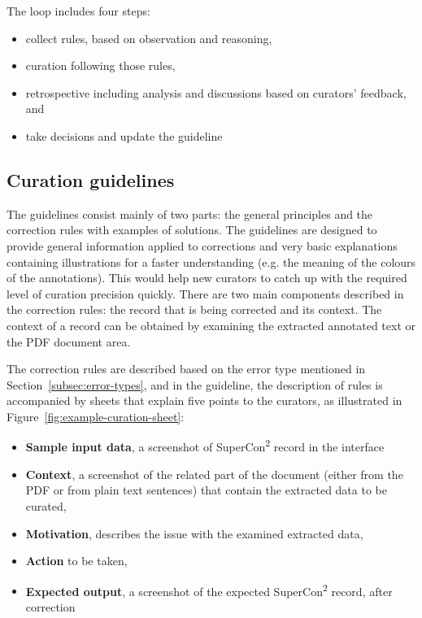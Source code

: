 \documentclass[a4paper]{article}
\begin{document}
The loop includes four steps: 
\begin{itemize}
    \item collect rules, based on observation and reasoning,
    \item curation following those rules,
    \item retrospective including analysis and discussions based on curators' feedback, and
    \item take decisions and update the guideline
\end{itemize}

\subsection{Curation guidelines}

The guidelines consist mainly of two parts: the general principles and the correction rules with examples of solutions.
The guidelines are designed to provide general information applied to corrections and very basic explanations containing illustrations for a faster understanding (e.g. the meaning of the colours of the annotations). This would help new curators to catch up with the required level of curation precision quickly. 
There are two main components described in the correction rules: the record that is being corrected and its context. 
The context of a record can be obtained by examining the extracted annotated text or the PDF document area.

The correction rules are described based on the error type mentioned in Section~\ref{subsec:error-types}, and in the guideline, the description of rules is accompanied by sheets that explain five points to the curators, as illustrated in Figure~\ref{fig:example-curation-sheet}:
\begin{itemize}
    \item \textbf{Sample input data}, a screenshot of SuperCon\textsuperscript{2} record in the interface
    \item \textbf{Context}, a screenshot of the related part of the document (either from the PDF or from plain text sentences) that contain the extracted data to be curated,
    \item \textbf{Motivation}, describes the issue with the examined extracted data, 
    \item \textbf{Action} to be taken, 
    \item \textbf{Expected output}, a screenshot of the expected SuperCon\textsuperscript{2} record, after correction
\end{itemize}
\end{document}
